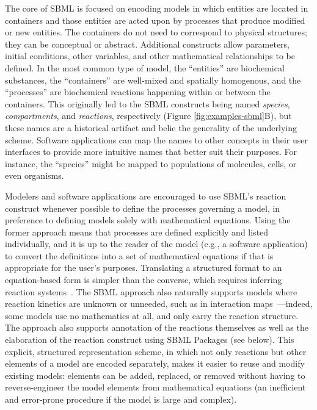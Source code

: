 \documentclass[]{draft-sbml-paper}
\begin{document}
The core of SBML is focused on encoding models in which entities are located in containers and those entities are acted upon by processes that produce modified or new entities.  The containers do not need to correspond to physical structures; they can be conceptual or abstract.  Additional constructs allow parameters, initial conditions, other variables, and other mathematical relationships to be defined.  In the most common type of model, the ``entities'' are biochemical substances, the ``containers'' are well-mixed and spatially homogenous, and the ``processes'' are biochemical reactions happening within or between the containers.  This originally led to the SBML constructs being named \emph{species}, \emph{compartments}, and \emph{reactions}, respectively (Figure \ref{fig:examples-sbml}B), but these names are a historical artifact and belie the generality of the underlying scheme.  Software applications can map the names to other concepts in their user interfaces to provide more intuitive names that better suit their purposes.  For instance, the ``species'' might be mapped to populations of molecules, cells, or even organisms.

Modelers and software applications are encouraged to use SBML's reaction construct whenever possible to define the processes governing a model, in preference to defining models solely with mathematical equations.  Using the former approach means that processes are defined explicitly and listed individually, and it is up to the reader of the model (e.g., a software application) to convert the definitions into a set of mathematical equations if that is appropriate for the user's purposes.  Translating a structured format to an equation-based form is simpler than the converse, which requires inferring reaction systems~\citep{Fages2015inferring}.  The SBML approach also naturally supports models where reaction kinetics are unknown or unneeded, such as in interaction maps~\citep[e.g.,][]{oda2005comprehensive, thiele2013community}---indeed, some models use no mathematics at all, and only carry the reaction structure.  The approach also supports annotation of the reactions themselves as well as the elaboration of the reaction construct using SBML Packages (see below).  This explicit, structured representation scheme, in which not only reactions but other elements of a model are encoded separately, makes it easier to reuse and modify existing models: elements can be added, replaced, or removed without having to reverse-engineer the model elements from mathematical equations (an inefficient and error-prone procedure if the model is large and complex).
\end{document}
